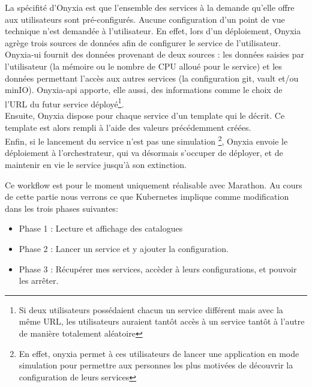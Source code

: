 \documentclass[11pt,fleqn]{book} %
\begin{document}
La spécifité d'Onyxia est que l'ensemble des services à la demande qu'elle offre aux utilisateurs sont pré-configurés. Aucune configuration d'un point de vue technique n'est demandée à l'utilisateur. En effet, lors d'un déploiement, Onyxia agrège trois sources de données afin de configurer le service de l'utilisateur. \\

Onyxia-ui fournit des données provenant de deux sources : les données saisies par l'utilisateur (la mémoire ou le nombre de CPU alloué pour le service) et les données permettant l'accès aux autres services (la configuration git, vault et/ou minIO). Onyxia-api apporte, elle aussi, des informations comme le choix de l'URL du futur service déployé\footnote{Si deux utilisateurs possédaient chacun un service différent mais avec la même URL, les utilisateurs auraient tantôt accès à un service tantôt à l'autre de manière totalement aléatoire}.\\

Ensuite, Onyxia dispose pour chaque service d'un template qui le décrit. Ce template est alors rempli à l'aide des valeurs précédemment créées.\\

Enfin, si le lancement du service n'est pas une simulation \footnote{En effet, onyxia permet à ces utilisateurs de lancer une application en mode simulation pour permettre aux personnes les plus motivées de découvrir la configuration de leurs services}, Onyxia envoie le déploiement à l'orchestrateur, qui va désormais s'occuper de déployer, et de maintenir en vie le service jusqu'à son extinction.

Ce workflow est pour le moment uniquement réalisable avec Marathon. Au cours de cette partie nous verrons ce que Kubernetes implique comme modification dans les trois phases suivantes:
\begin{itemize}
    \item Phase 1 : Lecture et affichage des catalogues
    \item Phase 2 : Lancer un service et y ajouter la configuration.
    \item Phase 3 : Récupérer mes services, accèder à leurs configurations, et pouvoir les arrêter.
\end{itemize}
\end{document}
